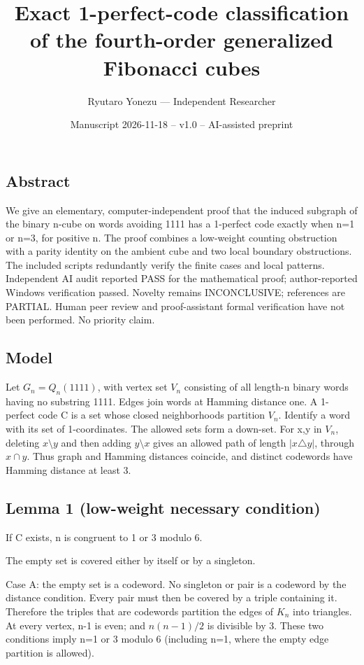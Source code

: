 \documentclass[
]{article}
\title{Exact 1-perfect-code classification of the fourth-order
generalized Fibonacci cubes}
\author{Ryutaro Yonezu --- Independent Researcher}
\date{Manuscript 2026-11-18 -- v1.0 -- AI-assisted preprint}
\begin{document}
\maketitle

\subsection{Abstract}\label{abstract}

We give an elementary, computer-independent proof that the induced
subgraph of the binary n-cube on words avoiding 1111 has a 1-perfect
code exactly when n=1 or n=3, for positive n. The proof combines a
low-weight counting obstruction with a parity identity on the ambient
cube and two local boundary obstructions. The included scripts
redundantly verify the finite cases and local patterns. Independent AI
audit reported PASS for the mathematical proof; author-reported Windows
verification passed. Novelty remains INCONCLUSIVE; references are
PARTIAL. Human peer review and proof-assistant formal verification have
not been performed. No priority claim.

\subsection{Model}\label{model}

Let \(G_n=Q_n(1111)\), with vertex set \(V_n\) consisting of all
length-n binary words having no substring 1111. Edges join words at
Hamming distance one. A 1-perfect code C is a set whose closed
neighborhoods partition \(V_n\). Identify a word with its set of
1-coordinates. The allowed sets form a down-set. For x,y in \(V_n\),
deleting \(x\setminus y\) and then adding \(y\setminus x\) gives an
allowed path of length \(|x\triangle y|\), through \(x\cap y\). Thus
graph and Hamming distances coincide, and distinct codewords have
Hamming distance at least 3.

\subsection{Lemma 1 (low-weight necessary
condition)}\label{lemma-1-low-weight-necessary-condition}

If C exists, n is congruent to 1 or 3 modulo 6.

The empty set is covered either by itself or by a singleton.

Case A: the empty set is a codeword. No singleton or pair is a codeword
by the distance condition. Every pair must then be covered by a triple
containing it. Therefore the triples that are codewords partition the
edges of \(K_n\) into triangles. At every vertex, n-1 is even; and
\(n(n-1)/2\) is divisible by 3. These two conditions imply n=1 or 3
modulo 6 (including n=1, where the empty edge partition is allowed).
\end{document}
